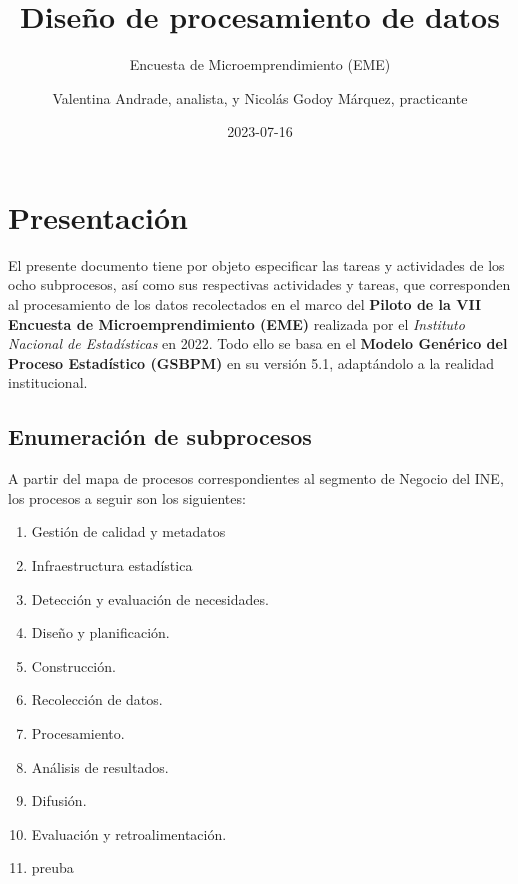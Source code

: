 \documentclass[
]{article}
\title{\vspace{5cm} Diseño de procesamiento de datos}
\subtitle{Encuesta de Microemprendimiento (EME)}
\author{\hfill\break
\vspace{6cm} Valentina Andrade, analista, y Nicolás Godoy Márquez, practicante}
\date{2023-07-16}
\providecommand{\tightlist}{%
  \setlength{\itemsep}{0pt}\setlength{\parskip}{0pt}}
\begin{document}
\maketitle

\newpage

\setcounter{tocdepth}{2}
\renewcommand{\contentsname}{Tabla de contenidos}
\tableofcontents

\newpage

\hypertarget{presentaciuxf3n}{%
\section{Presentación}\label{presentaciuxf3n}}

El presente documento tiene por objeto especificar las tareas y actividades de los ocho subprocesos, así como sus respectivas actividades y tareas, que corresponden al procesamiento de los datos recolectados en el marco del \textbf{Piloto de la VII Encuesta de Microemprendimiento (EME)} realizada por el \emph{Instituto Nacional de Estadísticas} en 2022. Todo ello se basa en el \textbf{Modelo Genérico del Proceso Estadístico (GSBPM)} en su versión 5.1, adaptándolo a la realidad institucional.

\hypertarget{enumeraciuxf3n-de-subprocesos}{%
\subsection{Enumeración de subprocesos}\label{enumeraciuxf3n-de-subprocesos}}

A partir del mapa de procesos correspondientes al segmento de Negocio del INE, los procesos a seguir son los siguientes:

\begin{enumerate}
\def\labelenumi{\arabic{enumi}.}
\tightlist
\item
  Gestión de calidad y metadatos
\item
  Infraestructura estadística
\item
  Detección y evaluación de necesidades.
\item
  Diseño y planificación.
\item
  Construcción.
\item
  Recolección de datos.
\item
  Procesamiento.
\item
  Análisis de resultados.
\item
  Difusión.
\item
  Evaluación y retroalimentación.
\item
  preuba
\end{enumerate}
\end{document}
